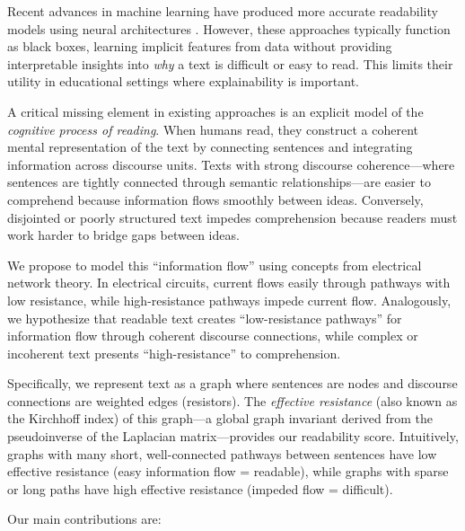 \documentclass[11pt,letterpaper]{article}
\begin{document}
Recent advances in machine learning have produced more accurate readability models using neural architectures \cite{Zhang2026}. However, these approaches typically function as black boxes, learning implicit features from data without providing interpretable insights into \textit{why} a text is difficult or easy to read. This limits their utility in educational settings where explainability is important.

A critical missing element in existing approaches is an explicit model of the \textit{cognitive process of reading}. When humans read, they construct a coherent mental representation of the text by connecting sentences and integrating information across discourse units. Texts with strong discourse coherence---where sentences are tightly connected through semantic relationships---are easier to comprehend because information flows smoothly between ideas. Conversely, disjointed or poorly structured text impedes comprehension because readers must work harder to bridge gaps between ideas.

We propose to model this ``information flow'' using concepts from electrical network theory. In electrical circuits, current flows easily through pathways with low resistance, while high-resistance pathways impede current flow. Analogously, we hypothesize that readable text creates ``low-resistance pathways'' for information flow through coherent discourse connections, while complex or incoherent text presents ``high-resistance'' to comprehension.

Specifically, we represent text as a graph where sentences are nodes and discourse connections are weighted edges (resistors). The \textit{effective resistance} (also known as the Kirchhoff index) of this graph---a global graph invariant derived from the pseudoinverse of the Laplacian matrix---provides our readability score. Intuitively, graphs with many short, well-connected pathways between sentences have low effective resistance (easy information flow = readable), while graphs with sparse or long paths have high effective resistance (impeded flow = difficult).

Our main contributions are:
\end{document}

